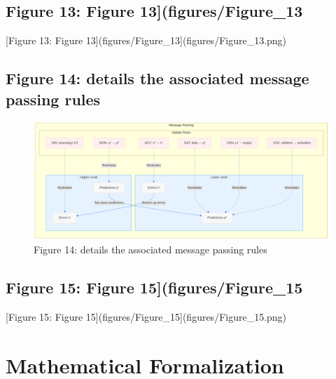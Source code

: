 \documentclass[
  11pt,
  letterpaper,
]{article}
\begin{document}
\pagebreak

\hypertarget{figure-13-figure-13figuresfigure_13}{%
\subsection{Figure 13: Figure
13{]}(figures/Figure\_13}\label{figure-13-figure-13figuresfigure_13}}

{[}Figure 13: Figure 13{]}(figures/Figure\_13{]}(figures/Figure\_13.png)

\pagebreak

\hypertarget{figure-14-details-the-associated-message-passing-rules}{%
\subsection{Figure 14: details the associated message passing
rules}\label{figure-14-details-the-associated-message-passing-rules}}

\begin{figure}
\centering
\includegraphics{figures/Figure_14.png}
\caption{Figure 14: details the associated message passing rules}
\end{figure}

\pagebreak

\hypertarget{figure-15-figure-15figuresfigure_15}{%
\subsection{Figure 15: Figure
15{]}(figures/Figure\_15}\label{figure-15-figure-15figuresfigure_15}}

{[}Figure 15: Figure 15{]}(figures/Figure\_15{]}(figures/Figure\_15.png)

\pagebreak

\hypertarget{mathematical-formalization}{%
\section{Mathematical Formalization}\label{mathematical-formalization}}
\end{document}
